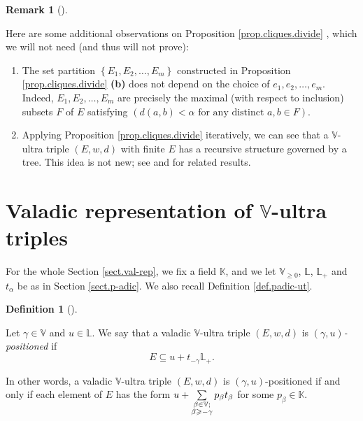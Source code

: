 \documentclass[numbers=enddot,12pt,final,onecolumn,notitlepage]{scrartcl}%
\theoremstyle{definition}
\newtheorem{defi}[theo]{Definition}
\newenvironment{definition}[1][]
{\begin{defi}[#1]\begin{leftbar}}
{\end{leftbar}\end{defi}}
\newtheorem{remk}[theo]{Remark}
\newenvironment{remark}[1][]
{\begin{remk}[#1]\begin{leftbar}}
{\end{leftbar}\end{remk}}
\let\sumnonlimits\sum
\renewcommand{\sum}{\sumnonlimits\limits}
\renewcommand{\geq}{\geqslant}
\theoremstyle{plainsl}
\begin{document}
\begin{remark}
Here are some additional observations on Proposition \ref{prop.cliques.divide}%
, which we will not need (and thus will not prove):

\begin{enumerate}
\item[\textbf{(a)}] The set partition $\left\{  E_{1},E_{2},\ldots
,E_{m}\right\}  $ constructed in Proposition \ref{prop.cliques.divide}
\textbf{(b)} does not depend on the choice of $e_{1},e_{2},\ldots,e_{m}$.
Indeed, $E_{1},E_{2},\ldots,E_{m}$ are precisely the maximal (with respect to
inclusion) subsets $F$ of $E$ satisfying $\left(  d\left(  a,b\right)
<\alpha\text{ for any distinct }a,b\in F\right)  $.

\item[\textbf{(b)}] Applying Proposition \ref{prop.cliques.divide}
iteratively, we can see that a $\mathbb{V}$-ultra triple $\left(
E,w,d\right)  $ with finite $E$ has a recursive structure governed by a tree.
This idea is not new; see \cite{Lemin03} and \cite[\S 2--\S 3]{PetDov14} for
related results.
\end{enumerate}
\end{remark}

\section{\label{sect.val-rep}Valadic representation of $\mathbb{V}$-ultra
triples}

For the whole Section \ref{sect.val-rep}, we fix a field $\mathbb{K}$, and we
let $\mathbb{V}_{\geq0}$, $\mathbb{L}$, $\mathbb{L}_{+}$ and $t_{\alpha}$ be
as in Section \ref{sect.p-adic}. We also recall Definition \ref{def.padic-ut}.

\begin{definition}
Let $\gamma\in\mathbb{V}$ and $u\in\mathbb{L}$. We say that a valadic
$\mathbb{V}$-ultra triple $\left(  E,w,d\right)  $ is $\left(  \gamma
,u\right)  $\textit{-positioned} if%
\[
E\subseteq u+t_{-\gamma}\mathbb{L}_{+}.
\]

\end{definition}

In other words, a valadic $\mathbb{V}$-ultra triple $\left(  E,w,d\right)  $
is $\left(  \gamma,u\right)  $-positioned if and only if each element of $E$
has the form $u+\sum\limits_{\substack{\beta\in\mathbb{V};\\\beta\geq-\gamma
}}p_{\beta}t_{\beta}$ for some $p_{\beta}\in\mathbb{K}$.
\end{document}
